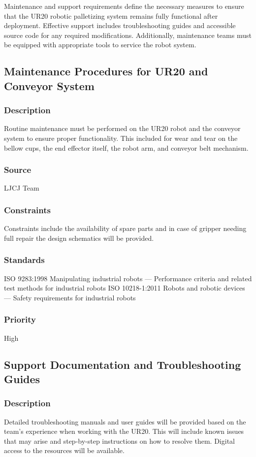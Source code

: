 Maintenance and support requirements define the necessary measures to ensure that the UR20 robotic palletizing system remains fully functional after deployment. Effective support includes troubleshooting guides and accessible source code for any required modifications. Additionally, maintenance teams must be equipped with appropriate tools to service the robot system.

\subsection{Maintenance Procedures for UR20 and Conveyor System}
\subsubsection{Description}
Routine maintenance must be performed on the UR20 robot and the conveyor system to ensure proper functionality. This included for wear and tear on the bellow cups, the end effector itself, the robot arm, and conveyor belt mechanism.
\subsubsection{Source}
LJCJ Team
\subsubsection{Constraints}
Constraints include the availability of spare parts and in case of gripper needing full repair the design schematics will be provided. 
\subsubsection{Standards}
ISO 9283:1998 Manipulating industrial robots — Performance criteria and related test methods for industrial robots
ISO 10218-1:2011 Robots and robotic devices — Safety requirements for industrial robots 
\subsubsection{Priority}
High

\subsection{Support Documentation and Troubleshooting Guides}
\subsubsection{Description}
Detailed troubleshooting manuals and user guides will be provided based on the team's experience when working with the UR20. This will include known issues that may arise and step-by-step instructions on how to resolve them. Digital access to the resources will be available.
